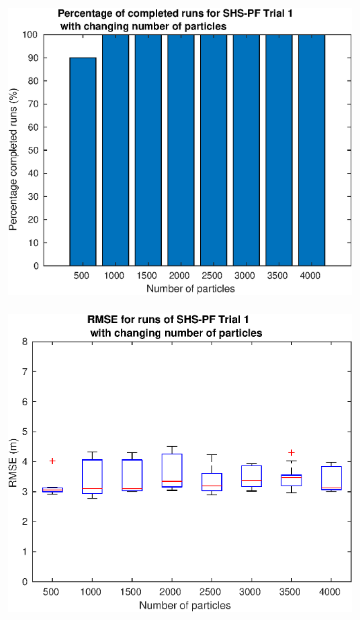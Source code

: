 \begin{figure}[H]
	\centering
	\begin{subfigure}[t]{.38\textwidth}
		\centering
		\includegraphics[width=\linewidth]{images/20201129_1147_Trial_1_nr_particles_1}
		\caption{}
		\label{fig:trial1_nr_particles}
	\end{subfigure} \quad
	\begin{subfigure}[t]{.4\textwidth}
		\centering
		\includegraphics[width=\linewidth]{images/20201129_1154_Trial_1_RMSE_nr_particles_1}
		\caption{}
		\label{fig:trial3_nr_particles}
	\end{subfigure} \quad
\end{figure}

